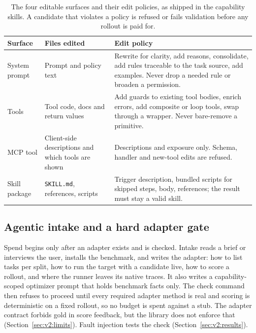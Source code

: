 \begin{table}[t]
\caption{The four editable surfaces and their edit policies, as shipped in the capability skills. A candidate that violates a policy is refused or fails validation before any rollout is paid for.}
\label{tab:v2:surfaces}
\centering\small
\begin{tabularx}{\columnwidth}{@{}p{}XX@{}}
\toprule
Surface & Files edited & Edit policy \\
\midrule
System prompt & Prompt and policy text & Rewrite for clarity, add reasons, consolidate, add rules traceable to the task source, add examples. Never drop a needed rule or broaden a permission. \\
Tools & Tool code, docs and return values & Add guards to existing tool bodies, enrich errors, add composite or loop tools, swap through a wrapper. Never bare-remove a primitive. \\
MCP tool & Client-side descriptions and which tools are shown & Descriptions and exposure only. Schema, handler and new-tool edits are refused. \\
Skill package & \texttt{SKILL.md}, references, scripts & Trigger description, bundled scripts for skipped steps, body, references; the result must stay a valid skill. \\
\bottomrule
\end{tabularx}
\end{table}

\subsection{Agentic intake and a hard adapter gate}
\label{sec:v2:intake}

Spend begins only after an adapter exists and is checked. Intake reads a brief or interviews the user, installs the benchmark, and writes the adapter: how to list tasks per split, how to run the target with a candidate live, how to score a rollout, and where the runner leaves its native traces. It also writes a capability-scoped optimizer prompt that holds benchmark facts only. The check command then refuses to proceed until every required adapter method is real and scoring is deterministic on a fixed rollout, so no budget is spent against a stub. The adapter contract forbids gold in score feedback, but the library does not enforce that (Section~\ref{sec:v2:limits}). Fault injection tests the check (Section~\ref{sec:v2:results}). 


